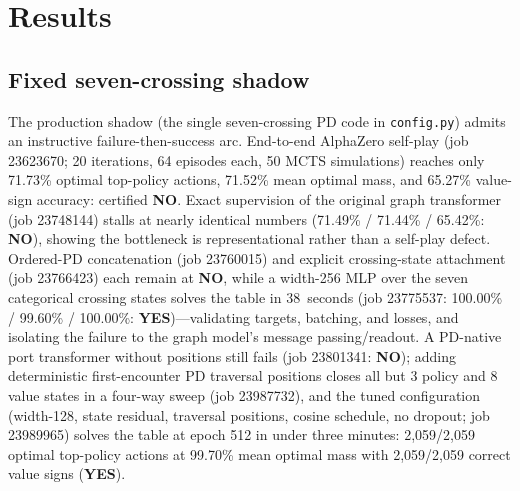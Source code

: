 \section{Results}
\label{sec:results}

\subsection{Fixed seven-crossing shadow}
\label{sec:seven}

The production shadow (the single seven-crossing PD code in
\texttt{config.py}) admits an instructive failure-then-success arc. End-to-end
AlphaZero self-play (job 23623670; 20 iterations, 64 episodes each, 50 MCTS
simulations) reaches only 71.73\% optimal top-policy actions, 71.52\% mean
optimal mass, and 65.27\% value-sign accuracy: certified \textbf{NO}. Exact
supervision of the original graph transformer (job 23748144) stalls at nearly
identical numbers (71.49\% / 71.44\% / 65.42\%: \textbf{NO}), showing the
bottleneck is representational rather than a self-play defect. Ordered-PD
concatenation (job 23760015) and explicit crossing-state attachment (job
23766423) each remain at \textbf{NO}, while a width-256 MLP over the seven
categorical crossing states solves the table in 38~seconds (job 23775537:
100.00\% / 99.60\% / 100.00\%: \textbf{YES})---validating targets, batching,
and losses, and isolating the failure to the graph model's message
passing/readout. A PD-native port transformer without positions still fails
(job 23801341: \textbf{NO}); adding deterministic first-encounter PD traversal
positions closes all but 3 policy and 8 value states in a four-way sweep (job
23987732), and the tuned configuration (width-128, state residual, traversal
positions, cosine schedule, no dropout; job 23989965) solves the table at epoch
512 in under three minutes: 2,059/2,059 optimal top-policy actions at 99.70\%
mean optimal mass with 2,059/2,059 correct value signs (\textbf{YES}).

